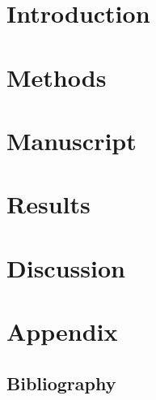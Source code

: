 \documentclass[11pt, titlepage, a4paper, twoside, onecolumn, DIV=calc]{scrbook} %
\begin{document}
\pagestyle{raphimen}




\part{Introduction}

 

 
 
 
 
 
% 
% 

\part{Methods}




\part{Manuscript}
\renewcommand{\cftdot}{}


\pagestyle{raphimen}

\part{Results}




\part{Discussion}
 

\part{Appendix}
\setcounter{chapter}{11}





\pagestyle{raphimen}



\chapter*{Bibliography}
\end{document}
